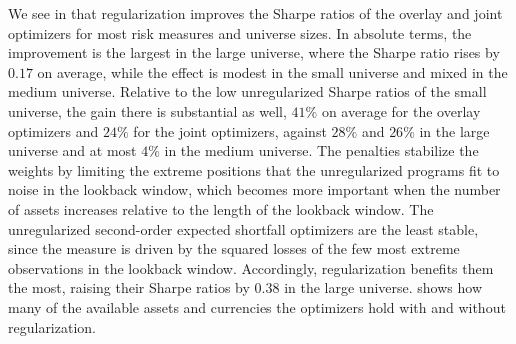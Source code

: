We see in  that regularization improves the Sharpe ratios of the overlay and joint optimizers for most risk measures and universe sizes. 
In absolute terms, the improvement is the largest in the large universe, where the Sharpe ratio
rises by $0.17$ on average, while the effect is modest in the small universe and mixed in the medium universe. Relative
to the low unregularized Sharpe ratios of the small universe, the gain there is substantial as well, $41\%$ on average
for the overlay optimizers and $24\%$ for the joint optimizers, against $28\%$ and $26\%$ in the large universe and at most $4\%$
in the medium universe. The penalties stabilize the weights by limiting the extreme positions that the unregularized programs fit to noise in the
lookback window, which becomes more important when the number of assets increases relative to the length of the lookback
window. The unregularized second-order expected shortfall optimizers are the least stable, since the measure is driven by
the squared losses of the few most extreme observations in the lookback window. Accordingly, regularization benefits them the most, raising their Sharpe ratios by $0.38$ in the large universe.
 shows how many of the available assets and currencies the optimizers hold with and
without regularization.

